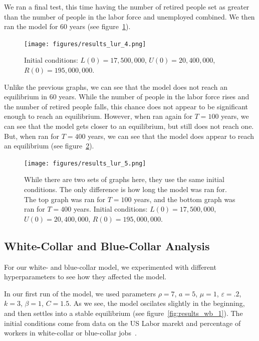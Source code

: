 \documentclass[11pt]{amsart}
\begin{document}
We ran a final test, this time having the number of retired people set as greater than the number of
people in the labor force and unemployed combined. We then ran the model for 60 years (see figure~\ref{fig:results_lur_4}).

\begin{figure}[h]
    \centering
    \texttt{[image: figures/results\_lur\_4.png]}
    \caption{Initial conditions: $L(0) = 17,500,000$, $U(0) = 20,400,000$, $R(0) = 195,000,000$.}
    \label{fig:results_lur_4}
\end{figure}

Unlike the previous graphs, we can see that the model does not reach an equilibrium in 60 years. 
While the number of people in the labor force rises and the number of retired people falls, 
this chance does not appear to be significant enough to reach an equilibrium. However,
when ran again for $T = 100$ years, we can see that the model gets closer to an equilibrium, but 
still does not reach one. But, when ran for $T = 400$ years, we can see that the model 
does appear to reach an equilibrium (see figure~\ref{fig:results_lur_5}).

\begin{figure}[h]
    \centering
    \texttt{[image: figures/results\_lur\_5.png]}
    \caption{While there are two sets of graphs here, they use the same initial conditions.
            The only difference is how long the model was ran for. The top graph was ran for $T = 100$ years, and 
            the bottom graph was ran for $T = 400$ years.
            Initial conditions: $L(0) = 17,500,000$, $U(0) = 20,400,000$, $R(0) = 195,000,000$.}
    \label{fig:results_lur_5}
\end{figure}


\subsection{White-Collar and Blue-Collar Analysis}

For our white- and blue-collar model, we experimented with different hyperparameters to see how they affected the model. 

In our first run of the model, we used parameters $\rho = 7$, $a = 5$, $\mu = 1$, $\varepsilon = .2$, $k = 3$, $\beta = 1$, $C = 1.5$. As we see, the model oscilates
slightly in the beginning, and then settles into a stable equilibrium (see figure~\ref{fig:results_wb_1}). The initial conditions come from data on the US Labor marekt and percentage of workers in white-collar or blue-collar jobs~\cite{BLS}.
\end{document}
